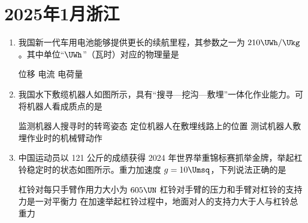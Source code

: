 \documentclass[\gkver]{gaokaozhenti}
\begin{document}
\chapter{2025年1月浙江}

\begin{enumerate}
\item
我国新一代车用电池能够提供更长的续航里程，其参数之一为 $210 \UWh/\Ukg$。其中单位“$\UWh$”（瓦时）对应的物理量是

{位移}
{电流}
{电荷量}


\item
我国水下敷缆机器人如图所示，具有“搜寻—挖沟—敷埋”一体化作业能力。可将机器人看成质点的是


{监测机器人搜寻时的转弯姿态}
{定位机器人在敷埋线路上的位置}
{测试机器人敷埋作业时的机械臂动作}


\item
中国运动员以 121 公斤的成绩获得 2024 年世界举重锦标赛抓举金牌，举起杠铃稳定时的状态如图所示。重力加速度 $g = 10 \Umsq$，下列说法正确的是


{杠铃对每只手臂作用力大小为 $605 \UN$}
{杠铃对手臂的压力和手臂对杠铃的支持力是一对平衡力}
{在加速举起杠铃过程中，地面对人的支持力大于人与杠铃总重力}


\end{enumerate}
\end{document}
